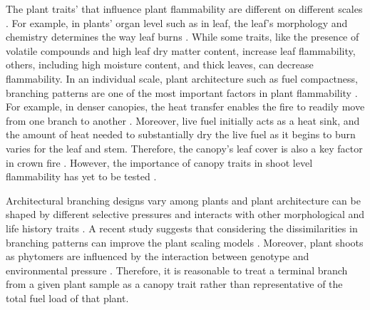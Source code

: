 \documentclass{ttuthes2007}
\begin{document}
The plant traits' that influence plant flammability are different on different scales \citep{pausas2017flammability}. For example, in plants' organ level such as in leaf, the leaf's morphology and chemistry determines the way leaf burns \citep{anderson1970forest, owens1998seasonal, schwilk2011scaling, pausas2016secondary, guerrero2021leaf, ganteaume2021volatile,alam2020shoot}. While some traits, like the presence of volatile compounds and high leaf dry matter content, increase leaf flammability, others, including high moisture content, and thick leaves, can decrease flammability. In an individual scale, plant architecture such as fuel compactness, branching patterns are one of the most important factors in plant flammability \citep{schwilk2003flammability, madrigal2012evaluation}. For example, in denser canopies, the heat transfer enables the fire to readily move from one branch to another \citep{bond1996fire}. Moreover, live fuel initially acts as a heat sink, and the amount of heat needed to substantially dry the live fuel as it begins to burn varies for the leaf and stem. Therefore, the canopy's leaf cover is  also a key factor in crown fire \citep{ray2005micrometeorological}. However, the importance of canopy traits in shoot level flammability has yet to be tested \citep{alam2020shoot}.



Architectural branching designs vary among plants \citep{halle2012tropical} and plant architecture can be shaped by different selective pressures \citep{danell1994browseeffects, schwilk2003flammability} and interacts with other morphological and life history traits \citep{ackerly1998leaf, schwilk2001flammability,archibald2003growing}. A recent study suggests that considering the dissimilarities in branching patterns can improve the plant scaling models \citep{bentley2013empirical}. Moreover, plant shoots as phytomers are influenced by the interaction between genotype and environmental pressure \citep{mcsteen2005shoot, wang2008molecular}. Therefore, it is reasonable to treat a terminal branch from a given plant sample as a canopy trait rather than representative of the total fuel load of that plant.

\end{document}
